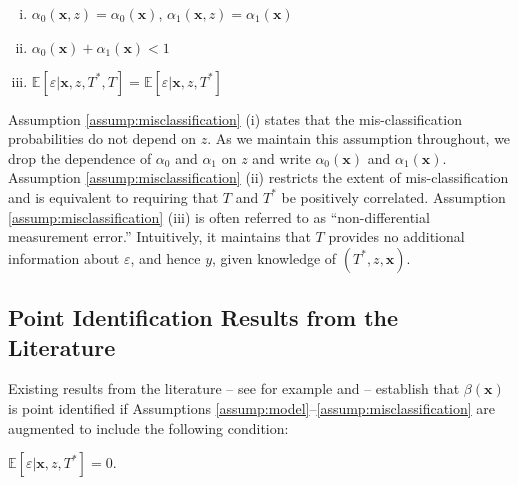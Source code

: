 \begin{assump} \mbox{}
  \label{assump:misclassification}
  \begin{enumerate}[(i)] 
    \item $\alpha_0(\mathbf{x},z) = \alpha_0(\mathbf{x})$,   $\alpha_1(\mathbf{x},z) = \alpha_1(\mathbf{x})$
    \item $\alpha_0(\mathbf{x}) + \alpha_1(\mathbf{x}) <1$ 
    \item $\mathbb{E}[\varepsilon|\mathbf{x},z,T^*,T] = \mathbb{E}[\varepsilon|\mathbf{x},z, T^*]$
  \end{enumerate}
\end{assump}

Assumption \ref{assump:misclassification} (i) states that the mis-classification probabilities do not depend on $z$.
As we maintain this assumption throughout, we drop the dependence of $\alpha_0$ and $\alpha_1$ on $z$ and write $\alpha_0(\mathbf{x})$ and $\alpha_1(\mathbf{x})$.
Assumption \ref{assump:misclassification} (ii) restricts the extent of mis-classification and is equivalent to requiring that $T$ and $T^*$ be positively correlated.
Assumption \ref{assump:misclassification} (iii) is often referred to as ``non-differential measurement error.''
Intuitively, it maintains that $T$ provides no additional information about $\varepsilon$, and hence $y$, given knowledge of $(T^*,z,\mathbf{x})$.

\subsection{Point Identification Results from the Literature}

Existing results from the literature -- see for example \cite{FL} and \cite{Mahajan} -- establish that $\beta(\mathbf{x})$ is point identified if Assumptions \ref{assump:model}--\ref{assump:misclassification} are augmented to include the following condition:
\begin{assump} \mbox{}
  \label{assump:jointExog}
    $\mathbb{E}[\varepsilon|\mathbf{x},z, T^*] = 0$.
\end{assump}

